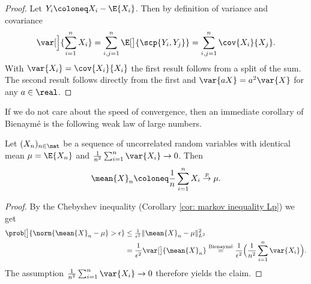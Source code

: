 \begin{proof}
    Let \(Y_i \coloneq X_i - \E{X_i}\). Then by definition of variance and covariance
    \[
        \var[\Big]{\sum_{i=1}^n X_i}
        = \sum_{i,j=1}^n \E[\big]{\scp{Y_i, Y_j}}
        = \sum_{i,j=1}^n \cov{X_i}{X_j}.
    \]
    With \(\var{X_i} = \cov{X_i}{X_i}\) the first result follows from a split of the sum.
    The second result follows directly from the first and
    \(
        \var{aX} = a^2 \var{X}
    \) for any \(a\in \real\).
\end{proof}

If we do not care about the speed of convergence, then an immediate corollary of
Bienaymé is the following weak law of large numbers.

\begin{corollary}
    \label{cor: weak law of large numbers}
    Let \((X_n)_{n\in \nat}\) be a sequence of uncorrelated random variables
    with identical mean \(\mu= \E{X_n}\) and \(\frac1{n^2} \sum_{i=1}^n \var{X_i} \to 0\).
    Then
    \[
        \mean{X}_n\coloneq \frac1n \sum_{i=1}^n X_i \overset{p}\to \mu.
    \]
\end{corollary}
\begin{proof}
    By the Chebyshev inequality (Corollary \ref{cor: markov inequality Lp})
    we get
    \begin{equation*}
        \begin{aligned}
        \prob[\big]{\norm{\mean{X}_n - \mu} > \epsilon}
        &\le \tfrac1{\epsilon^2}\|\mean{X}_n - \mu\|_{L^2}^2
        \\
        &= \frac1{\epsilon^2} \var[\big]{\mean{X}_n}
        \overset{\text{Bienaymé}}= \frac1{\epsilon^2}\Bigl(\frac1{n^2} \sum_{i=1}^n \var{X_i}\Bigr).
        \end{aligned}
    \end{equation*}
    The assumption \(\frac1{n^2} \sum_{i=1}^n \var{X_i} \to 0\) therefore
    yields the claim.
\end{proof}

